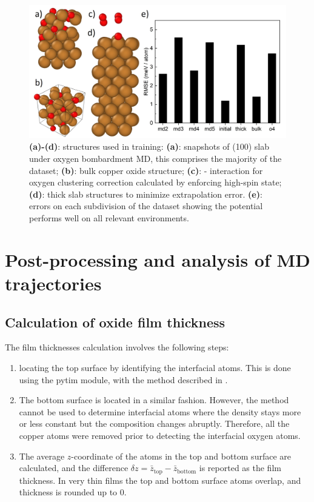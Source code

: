 \documentclass[manuscript=cmatex]{achemso}
\begin{document}
\begin{figure}[h]
  \centering
  \includegraphics[width=\textwidth]{structures}
  \caption[Representative structures used in training and energy error on the subsets]{\textbf{(a)-(d)}: structures used in training: \textbf{(a)}: snapshots of  (100) slab under oxygen bombardment MD, this comprises the majority of the dataset; \textbf{(b)}: bulk copper oxide structure; \textbf{(c)}: - interaction for oxygen clustering correction calculated by enforcing high-spin state; \textbf{(d)}: thick slab structures to minimize extrapolation error. \textbf{(e)}: errors on each subdivision of the dataset showing the potential performs well on all relevant environments.}
  \label{fig:subset}
\end{figure}
\section{Post-processing and analysis of MD trajectories}
\subsection{Calculation of oxide film thickness}
The film thicknesses calculation involves the following steps:
\begin{enumerate}
\item locating the top surface by identifying the interfacial atoms. This is done using the pytim module, with the method described in \cite{partay_new_2008}. 
\item The bottom surface is located in a similar fashion. However, the method cannot be used to determine interfacial atoms where the density stays more or less constant but the composition changes abruptly. Therefore, all the copper atoms were removed prior to detecting the interfacial oxygen atoms. 
\item The average $z$-coordinate of the atoms in the top and bottom surface are calculated, and the difference $\delta z = \bar{z}_{\mathrm{top}}-\bar{z}_{\mathrm{bottom}}$ is reported as the film thickness. In very thin films the top and bottom surface atoms overlap, and thickness is rounded up to 0. 
\end{enumerate}
\end{document}
